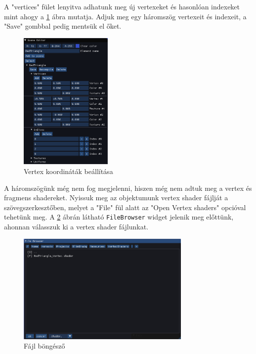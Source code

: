 A "vertices" fület lenyitva adhatunk meg új vertexeket és hasonlóan indexeket mint ahogy a \ref{fig:vertices} ábra mutatja. Adjuk meg egy háromszög vertexeit és indexeit, a "Save" gombbal pedig mentsük el őket.

\begin{figure}[hbt!]
    \centering
    \includegraphics[width=0.4\textwidth,height=\textheight/2,keepaspectratio]
    {resources/Showcase/slimshady_vertices.png}
    \caption{Vertex koordináták beállítása}
    \label{fig:vertices}
\end{figure}

A háromszögünk még nem fog megjelenni, hiszen még nem adtuk meg a vertex és fragmens shadereket. Nyissuk meg az objektumunk vertex shader fájlját a szövegszerkesztőben, melyet a "File" fül alatt az "Open Vertex shaders" opcióval tehetünk meg. A \ref{fig:filebrowser} ábrán látható \verb|FileBrowser| widget jelenik meg előttünk, ahonnan válasszuk ki a vertex shader fájlunkat.

\begin{figure}[hbt!]
    \centering
    \includegraphics[width=0.75\textwidth,height=\textheight/2,keepaspectratio]
    {resources/Showcase/slimshady_filebrowser.png}
    \caption{Fájl böngésző}
    \label{fig:filebrowser}
\end{figure}

